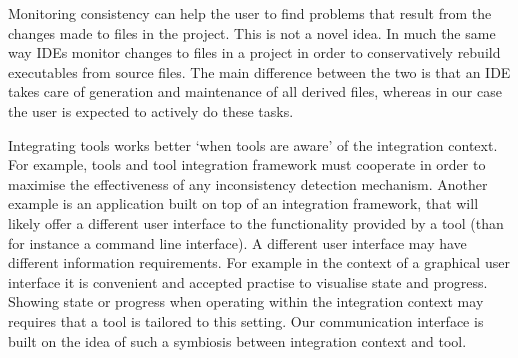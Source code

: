 \documentclass{article}
\begin{document}
  
  Monitoring consistency can help the user to find problems that result from
  the changes made to files in the project. This is not a novel idea. In much
  the same way IDEs monitor changes to files in a project in order to
  conservatively rebuild executables from source files. The main difference
  between the two is that an IDE takes care of generation and maintenance of
  all derived files, whereas in our case the user is expected to actively do
  these tasks.

 
  Integrating tools works better `when tools are aware' of the integration
  context. For example, tools and tool integration framework must cooperate in
  order to maximise the effectiveness of any inconsistency detection mechanism.
  Another example is an application built on top of an integration framework,
  that will likely offer a different user interface to the functionality
  provided by a tool (than for instance a command line interface).  A different
  user interface may have different information requirements. For example in
  the context of a graphical user interface it is convenient and accepted
  practise to visualise state and progress. Showing state or progress when
  operating within the integration context may requires that a tool is tailored
  to this setting. Our communication interface is built on the idea of such a
  symbiosis between integration context and tool.
\end{document}
